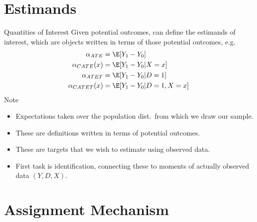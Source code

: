 \documentclass[aspectratio=169, handout]{beamer}
\begin{document}




\section{Estimands}


{\footnotesize
\begin{frame}{Quantities of Interest}
Given potential outcomes, can define the \alert{estimands} of interest,
which are objects written in terms of those potential outcomes, e.g.
\begin{align*}
  \alpha_{ATE}&=\E[Y_1-Y_0] \\
  \alpha_{CATE}(x)&=\E[Y_1-Y_0|X=x] \\
  \alpha_{ATET}&=\E[Y_1-Y_0|D=1] \\
  \alpha_{CATET}(x)&=\E[Y_1-Y_0|D=1,X=x]
\end{align*}
Note
\begin{itemize}
  \item Expectations taken over the population dist.\ from which
    we draw our sample.
  \pause
  \item These are \alert{definitions} written in terms of potential
    outcomes.
  \pause
  \item These are \alert{targets} that we wish to estimate using
    observed data.
  \item First task is \alert{identification}, connecting these to
    moments of \alert{actually observed} data $(Y,D,X)$.
\end{itemize}
\end{frame}
}


\section{Assignment Mechanism}
\end{document}

